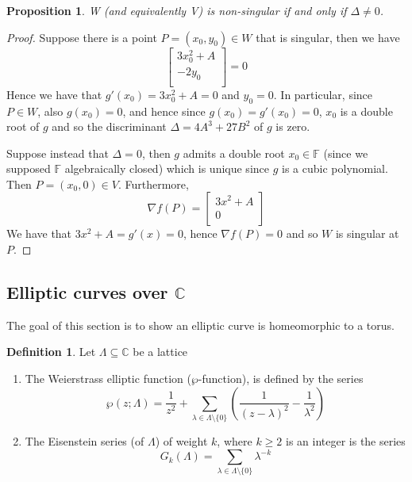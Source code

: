 \documentclass{article}
\newtheorem{proposition}[theorem]{Proposition}
\theoremstyle{definition}
\newtheorem{definition}{Definition}[section]
\theoremstyle{remark}
\newcommand{\F}{\mathbb{F}}
\newcommand{\C}{\mathbb{C}}
\begin{document}
\begin{proposition}
	W (and equivalently V)
	is non-singular if and only if $\Delta \neq 0$.
\end{proposition}
\begin{proof}
	Suppose there is a point $P = (x_0, y_0) \in W$ that is singular,
	then we have
	\begin{equation*}
		\begin{bmatrix}
			3x_0^2 + A\\
			-2y_0\\
		\end{bmatrix} = 0
	\end{equation*}
	Hence we have that $g'(x_0) = 3x_0^2 + A = 0$ and $y_0 = 0$.
	In particular, since $P \in W$, also 
	$g(x_0) = 0$, and hence since $g(x_0) = g'(x_0) = 0$,
	$x_0$ is a double root of $g$ and so the discriminant
	$\Delta = 4A^3 + 27B^2$ of $g$ is zero.

	Suppose instead that $\Delta = 0$, then $g$ admits a double root
	$x_0 \in \F$ (since we supposed $\F$ algebraically closed)
	which is unique since $g$ is a cubic polynomial.
	Then $P = (x_0, 0) \in V$.
	Furthermore,
	\begin{equation*}
		\nabla f(P) =
		\begin{bmatrix}
			3x^2 + A\\
			0\\
		\end{bmatrix}
	\end{equation*}
	We have that $3x^2 + A = g'(x) = 0$, hence $\nabla f(P) = 0$
	and so $W$ is singular at $P$.
\end{proof}

\subsection{Elliptic curves over \texorpdfstring{$\C$}{C}}

The goal of this section is to show an elliptic curve is
homeomorphic to a torus.

\begin{definition}
	Let $\Lambda \subseteq \C$ be a lattice
	\begin{enumerate}
		\item
			The Weierstrass
			elliptic function ($\wp$-function),
			is defined by the series
			\begin{equation*}
				\wp(z; \Lambda) = \frac{1}{z^2}
				+ \sum_{\lambda \in \Lambda\setminus\{0\}}
				\left(
					\frac{1}{(z-\lambda)^2} - \frac{1}{\lambda^2}
				\right)
			\end{equation*}
		\item
			The Eisenstein series (of $\Lambda$) of weight $k$,
			where $k \geq 2$ is an integer
			is the series
			\begin{equation*}
				G_k(\Lambda) = \sum_{\lambda \in \Lambda\setminus\{0\}}
				\lambda^{-k}
			\end{equation*}
	\end{enumerate}
\end{definition}
\end{document}
